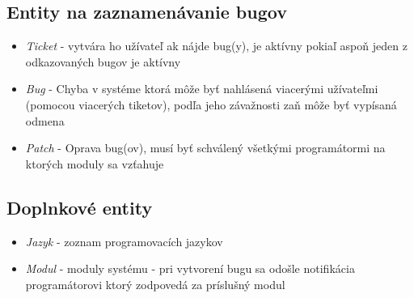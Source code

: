 \documentclass[11pt, a4paper]{article}
\begin{document}
	\subsection{Entity na zaznamenávanie bugov}

	\begin{itemize}
	\item \emph{Ticket} - vytvára ho užívateľ ak nájde bug(y), je aktívny pokiaľ aspoň jeden z odkazovaných bugov je aktívny
	\item \emph{Bug} - Chyba v systéme ktorá môže byť nahlásená viacerými užívateľmi (pomocou viacerých tiketov), podľa jeho závažnosti zaň môže byť vypísaná odmena
	\item \emph{Patch} - Oprava bug(ov), musí byť schválený všetkými programátormi na ktorých moduly sa vzťahuje
	\end{itemize}

	\subsection{Doplnkové entity}

	\begin{itemize}
	\item \emph{Jazyk} - zoznam programovacích jazykov
	\item \emph{Modul} - moduly systému - pri vytvorení bugu sa odošle notifikácia programátorovi ktorý zodpovedá za príslušný modul
	\end{itemize}
\end{document}
